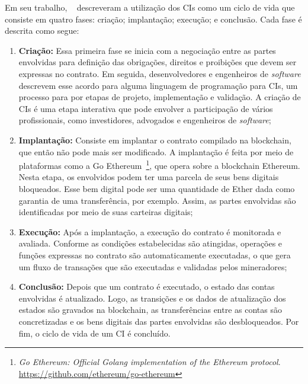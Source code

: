 Em seu trabalho, ~ descreveram a utilização dos CIs como um ciclo de vida que consiste em quatro fases: criação; implantação; execução; e conclusão. Cada fase é descrita como segue:
\begin{enumerate}
    \item \textbf{Criação:} Essa primeira fase se inicia com a negociação entre as partes envolvidas para definição das obrigações, direitos e proibições que devem ser expressas no contrato. Em seguida, desenvolvedores e engenheiros de \textit{software} descrevem esse acordo para alguma linguagem de programação para CIs, um processo para por etapas de projeto, implementação e validação. A criação de CIs é uma etapa interativa que pode envolver a participação de vários profissionais, como investidores, advogados e engenheiros de \textit{software};
    \item \textbf{Implantação:} Consiste em implantar o contrato compilado na blockchain, que então não pode mais ser modificado. A implantação é feita por meio de plataformas como a Go Ethereum~\footnote{\textit{Go Ethereum: Official Golang implementation of the Ethereum protocol}. \url{https://github.com/ethereum/go-ethereum}}, que opera sobre a blockchain Ethereum. Nesta etapa, os envolvidos podem ter uma parcela de seus bens digitais bloqueados. Esse bem digital pode ser uma quantidade de Ether dada como garantia de uma transferência, por exemplo. Assim, as partes envolvidas são identificadas por meio de suas carteiras digitais; 
    \item \textbf{Execução:} Após a implantação, a execução do contrato é monitorada e avaliada. Conforme as condições estabelecidas são atingidas, operações e funções expressas no contrato são automaticamente executadas, o que gera um fluxo de transações que são executadas e validadas pelos mineradores;
    \item \textbf{Conclusão:} Depois que um contrato é executado, o estado das contas envolvidas é atualizado. Logo, as transições e os dados de atualização dos estados são gravados na blockchain, as transferências entre as contas são concretizadas e os bens digitais das partes envolvidas são desbloqueados. Por fim, o ciclo de vida de um CI é concluído. 
\end{enumerate}

